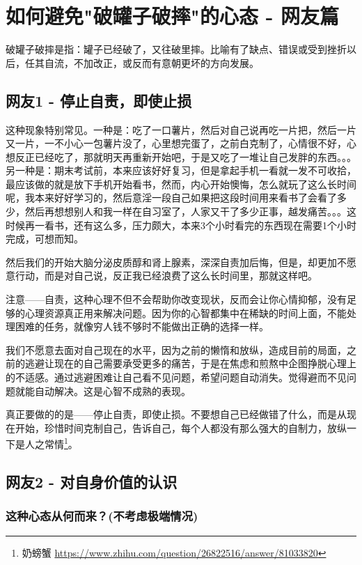 
\chapter{如何避免"破罐子破摔"的心态 - 网友篇}

破罐子破摔是指：罐子已经破了，又往破里摔。比喻有了缺点、错误或受到挫折以后，任其自流，不加改正，或反而有意朝更坏的方向发展。

\section{网友1 - 停止自责，即使止损}

这种现象特别常见。一种是：吃了一口薯片，然后对自己说再吃一片把，然后一片又一片，一不小心一包薯片没了，心里想完蛋了，之前白克制了，心情很不好，心想反正已经吃了，那就明天再重新开始吧，于是又吃了一堆让自己发胖的东西。。。另一种是：期末考试前，本来应该好好复习，但是拿起手机一看就一发不可收拾，最应该做的就是放下手机开始看书，然而，内心开始懊悔，怎么就玩了这么长时间呢，我本来好好学习的，然后意淫一段自己如果把这段时间用来看书了会看了多少，然后再想想别人和我一样在自习室了，人家又干了多少正事，越发痛苦。。。这时候再一看书，还有这么多，压力颇大，本来3个小时看完的东西现在需要1个小时完成，可想而知。

然后我们的开始大脑分泌皮质醇和肾上腺素，深深自责加后悔，但是，却更加不愿意行动，而是对自己说，反正我已经浪费了这么长时间里，那就这样吧。

注意——自责，这种心理不但不会帮助你改变现状，反而会让你心情抑郁，没有足够的心理资源真正用来解决问题。因为你的心智都集中在稀缺的时间上面，不能处理困难的任务，就像穷人钱不够时不能做出正确的选择一样。

我们不愿意去面对自己现在的水平，因为之前的懒惰和放纵，造成目前的局面，之前的逃避让现在的自己需要承受更多的痛苦，于是在焦虑和煎熬中企图挣脱心理上的不适感。通过逃避困难让自己看不见问题，希望问题自动消失。觉得避而不见问题就能自动解决。这是心智不成熟的表现。

真正要做的的是——停止自责，即使止损。不要想自己已经做错了什么，而是从现在开始，珍惜时间克制自己，告诉自己，每个人都没有那么强大的自制力，放纵一下是人之常情\footnote{奶螃蟹 \quad \url{https://www.zhihu.com/question/26822516/answer/81033820}}。

\section{网友2 - 对自身价值的认识}

\subsection{这种心态从何而来？(不考虑极端情况)}

